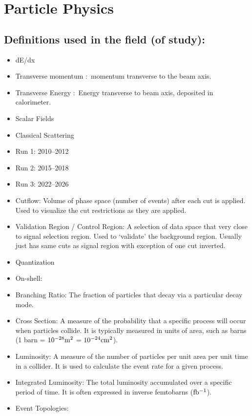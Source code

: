 \newpage
\section{Particle Physics}
\subsection{Definitions used in the field (of study):}
\newpage

\newpage
\begin{itemize}
	\item dE/dx
	\item Transverse momentum \pT:\@\ momentum transverse to the beam axis.
	\item Transverse Energy \ET:\@\ Energy transverse to beam axis, deposited in calorimeter.
	\item Scalar Fields
	\item Classical Scattering
	\item Run 1: 2010--2012
	\item Run 2: 2015--2018
	\item Run 3: 2022--2026
	\item Cutflow: Volume of phase space (number of events) after each cut is applied. Used to visualize the cut restrictions as they are applied. 
	\item Validation Region / Control Region: A selection of data space that very close to signal selection region. Used to `validate' the background region. Usually just has same cuts as signal region with exception of one cut inverted.
	\item Quantization
	\item On-shell: 
	\item Branching Ratio: The fraction of particles that decay via a particular decay mode.
	\item Cross Section: A measure of the probability that a specific process will occur when particles
	      collide. It is typically measured in units of area, such as barns (1 barn = $\rm 10^{-28} m^2$ = $\rm 10^{-24} cm^2$).
	\item Luminosity: A measure of the number of particles per unit area per unit time in a collider. It is used to calculate the event rate for a given process.
	\item Integrated Luminosity: The total luminosity accumulated over a specific period of time. It is often expressed in inverse femtobarns (\(\rm fb^{-1}\)).
	\item Event Topologies:
\end{itemize}
